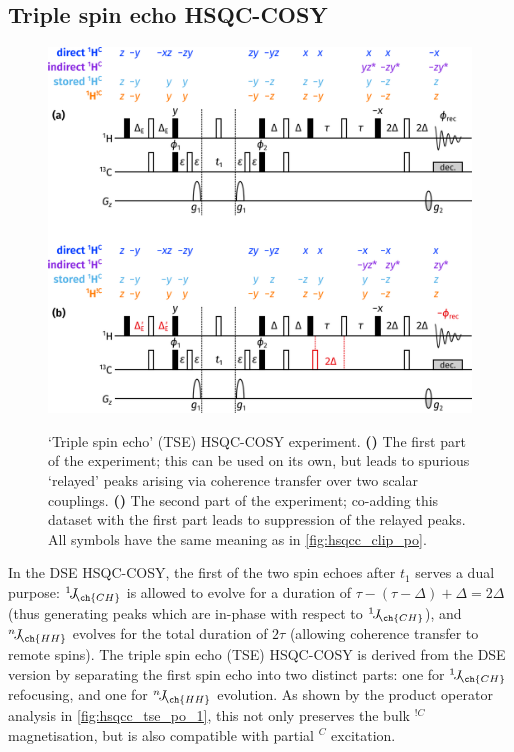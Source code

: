 \documentclass[a4paper,12pt]{article}
\newcommand{\magn}[1]{\ch{^1H}$^{#1}$}
\newcommand{\magnnot}[1]{\ch{^1H}$^{!#1}$}
\newcommand{\oneJ}[1]{{}^{1}\!J_{\!\ch{#1}}}
\newcommand{\nJ}[1]{{}^{n}\!J_{\!\ch{#1}}}
\begin{document}
\begin{refsection}
\section{Triple spin echo HSQC-COSY}

\begin{figure}[!ht]
    \centering
    \includegraphics[]{tse_po.png}%
    {\label{fig:hsqcc_tse_po_1}}%
    {\label{fig:hsqcc_tse_po_2}}%
    \caption[Triple spin echo HSQC-COSY experiment]{
        `Triple spin echo' (TSE) HSQC-COSY experiment.
        \textbf{()} The first part of the experiment; this can be used on its own, but leads to spurious `relayed' peaks arising via coherence transfer over two scalar couplings.
        \textbf{()} The second part of the experiment; co-adding this dataset with the first part leads to suppression of the relayed peaks.
        All symbols have the same meaning as in \cref{fig:hsqcc_clip_po}.
    }
    \label{fig:hsqcc_tse_po}
\end{figure}

In the DSE HSQC-COSY, the first of the two spin echoes after $t_1$ serves a dual purpose: $\oneJ{CH}$ is allowed to evolve for a duration of $\tau - (\tau - \Delta) + \Delta = 2\Delta$ (thus generating peaks which are in-phase with respect to $\oneJ{CH}$), and $\nJ{HH}$ evolves for the total duration of $2\tau$ (allowing coherence transfer to remote spins).
The triple spin echo (TSE) HSQC-COSY is derived from the DSE version by separating the first spin echo into two distinct parts: one for $\oneJ{CH}$ refocusing, and one for $\nJ{HH}$ evolution.
As shown by the product operator analysis in \cref{fig:hsqcc_tse_po_1}, this not only preserves the bulk \magnnot{C} magnetisation, but is also compatible with partial \magn{C} excitation.


\end{refsection}
\end{document}
